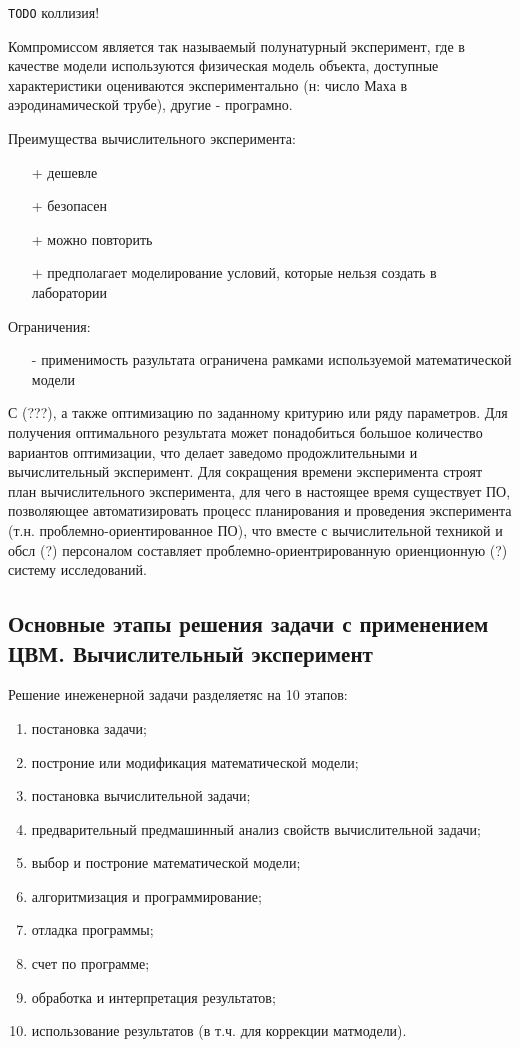 \documentclass[12pt]{article}
\begin{document}
\texttt{TODO} коллизия!

Компромиссом является так называемый полунатурный эксперимент, где в качестве модели используются физическая модель объекта, доступные характеристики оцениваются экспериментально (н: число Маха в аэродинамической трубе), другие - програмно.

Преимущества вычислительного эксперимента:
\begin{itemize}
    \item[+] дешевле
    \item[+] безопасен
    \item[+] можно повторить
    \item[+] предполагает моделирование условий, которые нельзя создать в лаборатории
\end{itemize}

Ограничения:
\begin{itemize}
    \item[-] применимость разультата ограничена рамками используемой математической модели
\end{itemize}


С (???), а также оптимизацию по заданному критурию или ряду параметров. Для получения оптимального результата может понадобиться большое количество вариантов оптимизации, что делает заведомо продожлительными и вычислительный эксперимент. Для сокращения времени эксперимента строят план вычислительного эксперимента, для чего в настоящее время существует ПО, позволяющее автоматизировать процесс планирования и проведения эксперимента (т.н. проблемно-ориентированное ПО), что вместе с вычислительной техникой и обсл (?) персоналом составляет проблемно-ориентрированную ориенционную (?) систему исследований.

\subsection{Основные этапы решения задачи с применением ЦВМ. Вычислительный эксперимент}
Решение инеженерной задачи разделяетяс на 10 этапов:
\begin{enumerate}
    \item постановка задачи;
    \item построние или модификация математической модели;
    \item постановка вычислительной задачи;
    \item предварительный предмашинный анализ свойств вычислительной задачи;
    \item выбор и построние математической модели;
    \item алгоритмизация и программирование;
    \item отладка программы;
    \item счет по программе;
    \item обработка и интерпретация результатов;
    \item использование результатов (в т.ч. для коррекции матмодели).
\end{enumerate}
\end{document}
